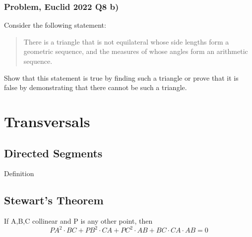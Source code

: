 \documentclass{article}
\begin{document}
\pagebreak

\subsubsection{Problem, Euclid 2022 Q8 b)}
Consider the following statement:
\begin{quote}
There is a triangle that is not equilateral whose side lengths form
a geometric sequence, and the measures of whose angles form an
arithmetic sequence.
\end{quote}
Show that this statement is true by finding such a triangle or prove that it is false
by demonstrating that there cannot be such a triangle.


\pagebreak

\section{Transversals}

\subsection{Directed Segments}
Definition
\vspace{30px}

\subsection{Stewart's Theorem}
If A,B,C collinear and P is any other point, then
$$PA^2\cdot BC+PB^2\cdot CA+PC^2\cdot AB+BC \cdot CA \cdot AB =0$$ 




\end{document}

